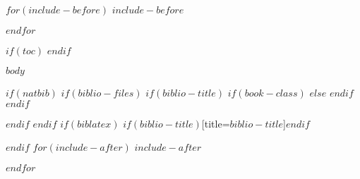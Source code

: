 \documentclass{book}
\begin{document}

$for(include-before)$
$include-before$

$endfor$



\makeatletter
\let\latexl@chapter\l@chapter
\def\l@chapter#1#2{\begingroup\let\numberline\@gobble\latexl@chapter{#1}{#2}\endgroup}
\makeatother


$if(toc)$
{
\hypersetup{linkcolor=black}
\tableofcontents
}
$endif$

$body$

$if(natbib)$
$if(biblio-files)$
$if(biblio-title)$
$if(book-class)$
\renewcommand\bibname{$biblio-title$}
$else$
\renewcommand\refname{$biblio-title$}
$endif$
$endif$


$endif$
$endif$
$if(biblatex)$
\printbibliography$if(biblio-title)$[title=$biblio-title$]$endif$

$endif$
$for(include-after)$
$include-after$

$endfor$
\end{document}
